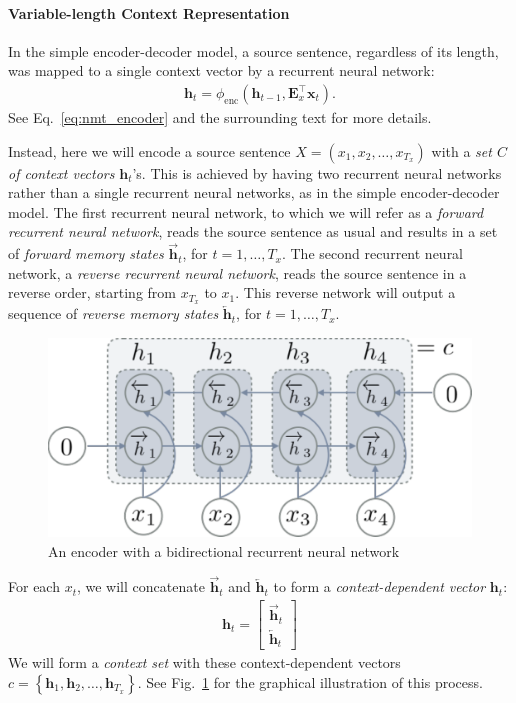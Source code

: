 \documentclass{report}
\newcommand{\vect}[1]{\mathbf{#1}}
\newcommand{\matr}[1]{\mathbf{#1}}
\newcommand{\vh}[0]{\vect{h}}
\newcommand{\vx}[0]{\vect{x}}
\newcommand{\mE}[0]{\matr{E}}
\newcommand{\enc}{\text{enc}}
\begin{document}
\paragraph{Variable-length Context Representation}

In the simple encoder-decoder model, a source sentence, regardless of its
length, was mapped to a single context vector by a recurrent neural network:
\begin{align*}
    \vh_t = \phi_{\enc}\left( \vh_{t-1}, \mE_x^\top \vx_t \right).
\end{align*}
See Eq.~\eqref{eq:nmt_encoder} and the surrounding text for more details.

Instead, here we will encode a source sentence $X=(x_1, x_2, \ldots, x_{T_x})$
with a {\em set $C$ of context vectors} $\vh_t$'s. This is achieved by having
two recurrent neural networks rather than a single recurrent neural networks, as
in the simple encoder-decoder model. The first recurrent neural network, to
which we will refer as a {\em forward recurrent neural network}, reads the
source sentence as usual and results in a set of {\em forward memory states}
$\overrightarrow{\vh}_t$, for $t=1,\ldots,T_x$. The second recurrent neural
network, a {\em reverse recurrent neural network}, reads the source sentence
in a reverse order, starting from $x_{T_x}$ to $x_1$. This reverse network will
output a sequence of {\em reverse memory states} $\overleftarrow{\vh}_t$, for
$t=1, \ldots, T_x$.

\begin{figure}[t]
    \centering
    \centering
    \includegraphics[width=0.7\columnwidth]{figures/bi_encoder.pdf}

    \caption{An encoder with a bidirectional recurrent neural network}
    \label{fig:bienc}
\end{figure}

For each $x_t$, we will concatenate $\overrightarrow{\vh}_t$ and
$\overleftarrow{\vh}_t$ to form a {\em context-dependent vector} $\vh_t$:
\begin{align}
    \label{eq:cd_rep}
    \vh_t = \left[ \begin{array}{c}
            \overrightarrow{\vh}_t \\
            \overleftarrow{\vh}_t
    \end{array} \right]
\end{align}
We will form a {\em context set} with these context-dependent vectors $c=\left\{
\vh_1, \vh_2, \ldots, \vh_{T_x}\right\}$. See Fig.~\ref{fig:bienc} for the
graphical illustration of this process.
\end{document}
